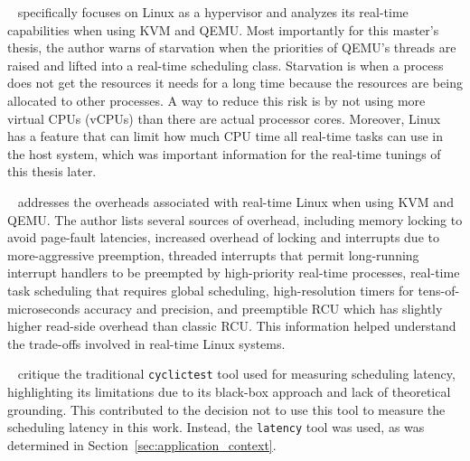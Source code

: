 \documentclass[MMR,Master,english]{style/twbook}
\begin{document}
\bigskip \noindent \citeauthor{kiszkaLinuxRealTimeHypervisor2009}~\cite{kiszkaLinuxRealTimeHypervisor2009} specifically focuses on Linux as a hypervisor and analyzes its real-time capabilities when using KVM and QEMU. Most importantly for this master's thesis, the author warns of starvation when the priorities of QEMU's threads are raised and lifted into a real-time scheduling class. Starvation is when a process does not get the resources it needs for a long time because the resources are being allocated to other processes. A way to reduce this risk is by not using more virtual CPUs (vCPUs) than there are actual processor cores. Moreover, Linux has a feature that can limit how much CPU time all real-time tasks can use in the host system, which was important information for the real-time tunings of this thesis later.

\clearpage

\bigskip \noindent \citeauthor{mckenneyRealTimeVs2008}~\cite{mckenneyRealTimeVs2008} addresses the overheads associated with real-time Linux when using KVM and QEMU. The author lists several sources of overhead, including memory locking to avoid page-fault latencies, increased overhead of locking and interrupts due to more-aggressive preemption, threaded interrupts that permit long-running interrupt handlers to be preempted by high-priority real-time processes, real-time task scheduling that requires global scheduling, high-resolution timers for tens-of-microseconds accuracy and precision, and preemptible RCU which has slightly higher read-side overhead than classic RCU. This information helped understand the trade-offs involved in real-time Linux systems.

\bigskip \noindent \citeauthor{deoliveiraDemystifyingRealTimeLinux2020}~\cite{deoliveiraDemystifyingRealTimeLinux2020} critique the traditional \texttt{cyclictest} tool used for measuring scheduling latency, highlighting its limitations due to its black-box approach and lack of theoretical grounding. This contributed to the decision not to use this tool to measure the scheduling latency in this work. Instead, the \texttt{latency} tool was used, as was determined in Section~\ref{sec:application_context}.
\end{document}
